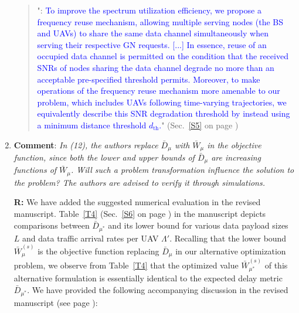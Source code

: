 \documentclass[12pt, draftcls, onecolumn]{IEEEtran}
\theoremstyle{plain}
\theoremstyle{definition}
\theoremstyle{remark}
\newcommand\hlt[1]{\textcolor{blue}{#1}}
\begin{document}
\begin{enumerate}
\begin{quote}
        "\noindent{\hlt{\textbf{Frequency Reuse}}}: \hlt{To improve the spectrum utilization efficiency, we propose a frequency reuse mechanism, allowing multiple serving nodes (the BS and UAVs) to share the same data channel simultaneously when serving their respective GN requests. [...] In essence, reuse of an occupied data channel is permitted on the condition that the received SNRs of nodes sharing the data channel degrade no more than an acceptable pre-specified threshold permits. Moreover, to make operations of the frequency reuse mechanism more amenable to our problem, which includes UAVs following time-varying trajectories, we equivalently describe this SNR degradation threshold by instead using a minimum distance threshold $d_{\mathrm{th}}$.}" (Sec.~\ref{S5} on page \pageref{freq_reuse_label})
    \end{quote}
    \vspace{4mm}
    
    \item \textbf{Comment}: \emph{In (12), the authors replace $\bar{D}_{\mu}$ with $\bar{W}_{\mu}$ in the objective function, since both the lower and upper bounds of $\bar{D}_{\mu}$ are increasing functions of $\bar{W}_{\mu}$. Will such a problem transformation influence the solution to the problem? The authors are advised to verify it through simulations.}
    \vspace{2mm}
    
    \textbf{R:} We have added the suggested numerical evaluation in the revised manuscript.
    Table~\ref{T4} (Sec.~\ref{S6} on page \pageref{T4}) in the manuscript depicts comparisons between $\bar{D}_{\mu^*}$ and its lower bound for various data payload sizes $L$ and data traffic arrival rates per UAV $\Lambda'$. Recalling that the lower bound $\bar{W}_{\mu}^{(s)}$ is the objective function replacing $\bar{D}_{\mu}$ in our alternative optimization problem, we observe from Table~\ref{T4} that the optimized value $\bar{W}_{\mu^*}^{(s)}$ of this alternative formulation is essentially identical to the expected delay metric $\bar{D}_{\mu^*}$. We have provided the following accompanying discussion in the revised manuscript (see page \pageref{Validation}):


\end{enumerate}
\end{document}
